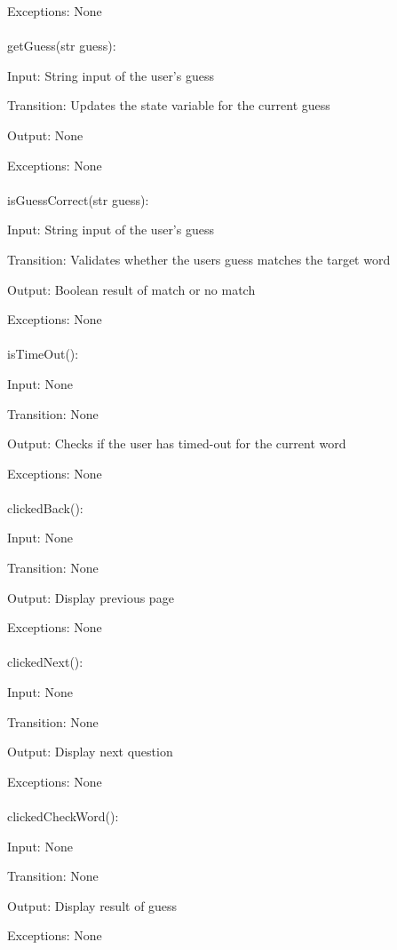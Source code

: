 \documentclass[12,english]{article}
\begin{document}
		Exceptions: None\\
		\\
		getGuess(str guess):
		
		Input: String input of the user's guess
		
		Transition: Updates the state variable for the current guess
		
		Output: None
		
		Exceptions: None\\
		\\
		isGuessCorrect(str guess):
		
		Input: String input of the user's guess
		
		Transition: Validates whether the users guess matches the target word
		
		Output: Boolean result of match or no match
		
		Exceptions: None\\
		\\
		isTimeOut():
		
		Input: None
		
		Transition: None
		
		Output: Checks if the user has timed-out for the current word
		
		Exceptions: None\\
		\\
		clickedBack():
		
		Input: None
		
		Transition: None
		
		Output: Display previous page
		
		Exceptions: None\\
		\\
		clickedNext():
		
		Input: None
		
		Transition: None
		
		Output: Display next question 
		
		Exceptions: None\\
		\\
		clickedCheckWord():
		
		Input: None
		
		Transition: None
		
		Output: Display result of guess 
		
		Exceptions: None\\
		\\
		
\end{document}
